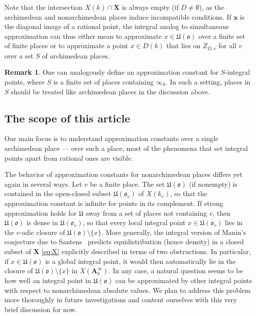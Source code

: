 \documentclass[a4paper, twoside, 11pt]{amsart}
\theoremstyle{definition}
\newtheorem{remark}[theorem]{Remark}
\newcommand{\bx}{{\boldsymbol{x}}}
\newcommand{\RA}{{\mathbf{A}}}
\newcommand{\bX}{{\boldsymbol{X}}}
\newcommand{\mU}{\mathfrak{U}}
\newcommand{\fo}{\mathfrak{o}}
\begin{document}
Note that the intersection $X(k)\cap \bX$ is always empty (if $D\ne \emptyset$), as the archimedean and nonarchimedean places induce incompatible conditions. If $\bx$ is the diagonal image of a rational point, the integral analog to simultaneous approximation can thus either mean to approximate $x\in \mU(\fo)$ over a finite set of finite places or to approximate a point $x\in D(k)$ that lies on $Z_{D,v}$ for all $v$ over a set $S$ of archimedean places. 


\begin{remark}
  One can analogously define an approximation constant for $S$-integral points, where $S$ is a finite set of places containing $\infty_k$. In such a setting, places in $S$ should be treated like archimedean places in the discussion above.
\end{remark}

\subsection{The scope of this article}
Our main focus is to understand approximation constants over a single archimedean place --- over such a place, most of the phenomena that set integral points apart from rational ones are visible.

The behavior of approximation constants for nonarchimedean places differs yet again in several ways. Let $v$ be a finite place. The set $\mU(\fo)$ (if nonempty) is contained in the open-closed subset $\mU(\fo_v)$ of $X(k_v)$, so that the approximation constant is infinite for points in its complement. If strong approximation holds for $\mU$ away from a set of places not containing $v$, then $\mU(\fo)$ is dense in $\mU(\fo_v)$, so that every local integral point $x\in \mU(\fo_v)$ lies in the $v$-adic closure of $\mU(\fo)\setminus \{x\}$. More generally, the integral version of Manin's conjecture due to Santens~\cite{Santens} predicts equidistribution (hence density) in a closed subset of $\bX$ \eqref{eq:X} explicitly described in terms of two obstructions. 
In particular, if $x\in \mU(\fo)$ is a global integral point, it would then automatically lie in the closure of $\mU(\fo)\setminus \{x\}$ in $X(\RA_k^{\infty})$.
In any case, a natural question seems to be how well an integral point in $\mU(\fo)$ can be approximated by other integral points with respect to nonarchimedean absolute values.
We plan to address this problem more thoroughly in future investigations and content ourselves with this very brief discussion for now.
\end{document}
